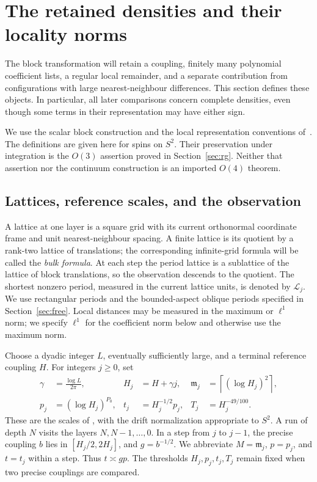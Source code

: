 \section{The retained densities and their locality norms}
\label{sec:setup}

The block transformation will retain a coupling, finitely many polynomial
coefficient lists, a regular local remainder, and a separate contribution
from configurations with large nearest-neighbour differences.  This section
defines these objects.  In particular, all later comparisons concern
complete densities, even though some terms in their representation may
have either sign.

We use the scalar block construction and the local representation
conventions of~\cite{OpenAI-O4}.  The definitions are given here for
spins on \(S^2\).  Their preservation under integration is the
\(O(3)\) assertion proved in Section~\ref{sec:rg}.  Neither that assertion
nor the continuum construction is an imported \(O(4)\) theorem.

\subsection{Lattices, reference scales, and the observation}
\label{setup:scales}

A lattice at one layer is a square grid with its current orthonormal
coordinate frame and unit nearest-neighbour spacing.  A finite lattice
is its quotient by a rank-two lattice of translations; the corresponding
infinite-grid formula will be called the \emph{bulk formula}.  At each step the period lattice is a sublattice of the lattice of block
translations, so the observation descends to the quotient.  The
shortest nonzero period, measured in the current lattice units, is denoted
by \(\mathcal L_j\).  We use rectangular periods and the bounded-aspect
oblique periods specified in Section~\ref{sec:free}.  Local distances may
be measured in the maximum or \(\ell^1\) norm; we specify \(\ell^1\) for
the coefficient norm below and otherwise use the maximum norm.

Choose a dyadic integer \(L\), eventually sufficiently large, and a
terminal reference coupling \(H\).  For integers \(j\ge0\), set
\begin{equation}
 \begin{aligned}
 \gamma&=\frac{\log L}{2\pi},&
 H_j&=H+\gamma j,&
 \mathfrak m_j&=\left\lceil(\log H_j)^2\right\rceil,\\
 p_j&=(\log H_j)^{P_0},&
 t_j&=H_j^{-1/2}p_j,&
 T_j&=H_j^{-49/100}.
 \end{aligned}
 \label{setup:scale-definitions}
\end{equation}
These are the scales of , with the drift normalization
appropriate to \(S^2\).  A run of depth \(N\) visits the layers
\(N,N-1,\ldots,0\).  In a step from \(j\) to \(j-1\), the precise
coupling \(b\) lies in \([H_j/2,2H_j]\), and
\(g=b^{-1/2}\).  We abbreviate \(M=\mathfrak m_j\),
\(p=p_j\), and \(t=t_j\) within a step.  Thus \(t\asymp gp\).
The thresholds \(H_j,p_j,t_j,T_j\) remain fixed when two precise
couplings are compared.

